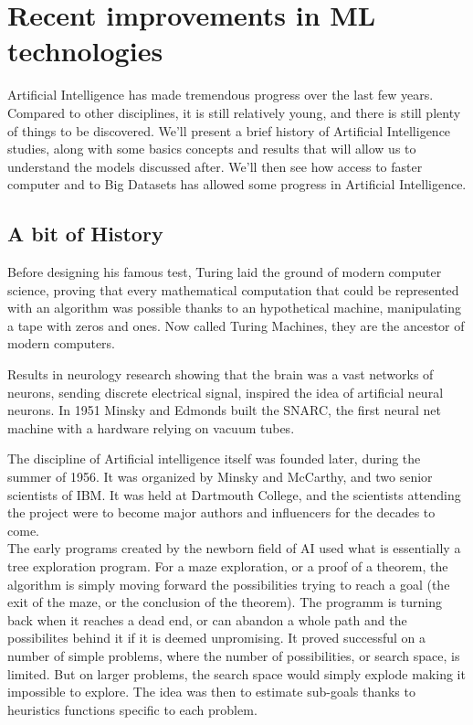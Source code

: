 \documentclass[12pt]{article}
\begin{document}
\pagebreak


\section{Recent improvements in ML technologies}

Artificial Intelligence has made tremendous progress over the last few years.
Compared to other disciplines, it is still relatively young, and there is still
plenty of things to be discovered. We'll present a brief history of Artificial
Intelligence studies, along with some basics concepts and results that will
allow us to understand the models discussed after. We'll then see how access to
faster computer and to Big Datasets has allowed some progress in Artificial
Intelligence.

\subsection{A bit of History}

\smallskip

Before designing his famous test, Turing laid the ground of modern computer
science, proving that every mathematical computation that could be represented
with an algorithm was possible thanks to an hypothetical machine, manipulating
a tape with zeros and ones. Now called Turing Machines, they are the ancestor
of modern computers.\cite{Turing1936}

Results in neurology research showing that the brain was a vast networks of
neurons, sending discrete electrical signal, inspired the idea of artificial
neural neurons. In 1951 Minsky and Edmonds built the SNARC, the first neural net
machine with a hardware relying on vacuum tubes.

The discipline of Artificial intelligence itself was founded later, during the
summer of 1956. It was organized by Minsky and McCarthy, and two senior
scientists of IBM. It was held at Dartmouth College, and the scientists
attending the project were to become major authors and influencers for the
decades to come. \cite{DartMouth}\\

The early programs created by the newborn field of AI used what is essentially a
tree exploration program. For a maze exploration, or a proof of a theorem, the
algorithm is simply moving forward the possibilities trying to reach a goal (the
exit of the maze, or the conclusion of the theorem). The programm is turning
back when it reaches a dead end, or can abandon a whole path and the
possibilites behind it if it is deemed unpromising. It proved successful on a
number of simple problems, where the number of possibilities, or search space,
is limited. But on larger problems, the search space would simply explode making
it impossible to explore. The idea was then to estimate sub-goals thanks to
heuristics functions specific to each problem.
\end{document}
